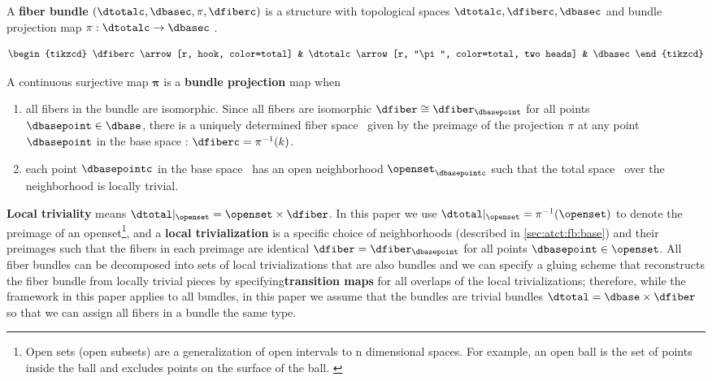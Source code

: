 \begin{definition}\label{def:fiber_bundle}
   A \textbf{fiber bundle} $(\dtotalc, \dbasec, \pi, \dfiberc)$ is a structure with topological spaces $\dtotalc, \dfiberc, \dbasec$ and  bundle projection map $\pi: \dtotalc \rightarrow \dbasec$ \cite{spanierAlgebraicTopology1989}.

   \begin{equation} \label{eq:atct:fb:intro}
    \begin{tikzcd}
      \dfiberc \arrow[r, hook, color=total] & \dtotalc \arrow[r, "\pi", color=total, two heads] & \dbasec
      \end{tikzcd}
    \end{equation}

A continuous surjective map $\bm{\pi}$ is a \textbf{bundle projection} map when
\begin{enumerate}
  \item all fibers in the bundle are isomorphic. Since all fibers are isomorphic $\dfiber \cong \dfiber_{\dbasepoint}$ for all points $\dbasepoint \in \dbase$, there is a uniquely determined \textcolor{fiber}{fiber space} \dfiberc\ given by the preimage of the projection $\pi$ at any point $\dbasepoint$ in the \textcolor{base}{base space} \dbasec: $\dfiberc = \pi^{-1}(k)$.
  \item each point $\dbasepointc$ in the \textcolor{base}{base space} \dbasec\ has an open neighborhood $\openset_{\dbasepointc}$ such that the \textcolor{total}{total space} \dtotalc\ over the neighborhood is locally trivial.
\end{enumerate}
\end{definition}

\textbf{Local triviality} means $\dtotal\vert_{\openset} = \openset\times \dfiber$. In this paper we use $\dtotal\vert_{\openset} = \pi^{-1}(\openset)$ to denote the preimage of an openset\footnote{Open sets (open subsets) are a generalization of open intervals to n dimensional spaces. For example, an open ball is the set of points inside the ball and excludes points on the surface of the ball. \cite{weissteinOpenSet,bradleyTopologyVsTopology}}, and a \textbf{local trivialization} is a specific choice of neighborhoods (described in \autoref{sec:atct:fb:base}) and their preimages such that the fibers in each preimage are identical $\dfiber = \dfiber_{\dbasepoint}$ for all points $\dbasepoint \in \openset$. All fiber bundles can be decomposed into sets of local trivializations that are also bundles and we can specify a gluing scheme that reconstructs the fiber bundle from locally trivial pieces by specifying\textbf{transition maps} for all overlaps of the local trivializations; therefore, while the framework in this paper applies to all bundles, in this paper we assume that the bundles are trivial bundles $\dtotal = \dbase \times \dfiber$ so that we can assign all fibers in a bundle the same type.

